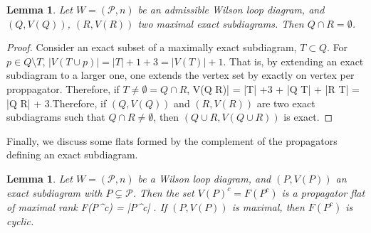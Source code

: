 \documentclass[11pt]{article}
\newcommand{\rk}{\textrm{rk}}
\def\bas #1\eas{\begin{align*} #1 \end{align*}}
\newcommand{\cP}{\mathcal{P}}
\newtheorem{lem}[thm]{Lemma}
\theoremstyle{remark}
\theoremstyle{definition}
\begin{document}
\begin{lem} \label{disjointexactsubdiagslem}
Let $W = (\cP, n)$ be an admissible Wilson loop diagram, and $(Q, V(Q))$, $(R, V(R))$ two maximal exact subdiagrams. Then $Q\cap R = \emptyset$.
\end{lem}

\begin{proof}
Consider an exact subset of a maximally exact subdiagram, $T \subset Q$. For $p \in Q \setminus T$, $|V(T \cup p)| = |T| +1 +3  = |V(T)| +1$. That is, by extending an exact subdiagram to a larger one, one extends the vertex set by exactly on vertex per proppagator. Therefore, if $T \neq \emptyset = Q \cap R$, \bas |V(Q \cup R)| = |T| +3 + |Q \setminus T| + |R \setminus T| = |Q \cup R| + 3\;.\eas Therefore, if $(Q, V(Q))$ and $(R, V(R))$ are two exact subdiagrams such that $Q\cap R \neq \emptyset$, then $(Q \cup R, V(Q \cup R))$ is exact.
\end{proof}

Finally, we discuss some flats formed by the complement of the propagators defining an exact subdiagram.


\begin{lem} \label{maxexactcomplementrank}
Let $W = (\cP, n)$ be a Wilson loop diagram, and $(P, V(P))$ an exact subdiagram with $P \subsetneq \cP$. Then the set $V(P)^c = F(P^c)$ is a propagator flat of maximal rank  \bas \rk F(P^c) = |P^c| \;. \eas If $(P, V(P))$ is maximal, then $F(P^c)$ is cyclic.
\end{lem}
\end{document}
